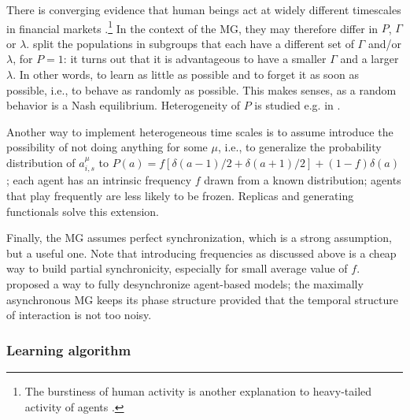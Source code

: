 \documentclass[aps,twocolumn,nofootinbib,sortedaddress,reprint]{revtex4-1}
\begin{document}
There is converging evidence that human beings act at widely different
timescales in financial markets
\cite{LilloUtility,zhou2012strategies}.\footnote{The burstiness of
  human activity is another explanation to heavy-tailed activity of
  agents \cite{BarabasiActivity}.} In the context of the MG, they may
therefore differ in $P$, $\Gamma$ or
$\lambda$. \textcite{mosetti2006minority} split the populations in
subgroups that each have a different set of $\Gamma$ and/or $\lambda$,
for $P=1$: it turns out that it is advantageous to have a smaller
$\Gamma$ and a larger $\lambda$. In other words, to learn as little as possible
and to forget it as soon as possible, i.e., to behave as randomly as
possible. This makes senses, as a random behavior is a Nash equilibrium. Heterogeneity of $P$ is
studied e.g. in
\textcite{CZ97,CZ98,SavitPayoff,JohnsonEnhancedWinnings,MMM}.

Another way to implement heterogeneous time scales is to assume
introduce the possibility of not doing anything for some $\mu$, i.e.,
to generalize the probability distribution of $a_{i,s}^\mu$ to
$P(a)=f[\delta(a-1)/2+\delta(a+1)/2]+(1-f)\delta(a)$ \cite{Piai}; each
agent has an intrinsic frequency $f$ drawn from a known distribution;
agents that play frequently are less likely to be frozen. Replicas
\cite{Piai} and generating functionals \cite{demartino2003dynamics}
solve this extension.

Finally, the MG assumes perfect synchronization, which is a strong
assumption, but a useful one. Note that introducing frequencies as
discussed above is a cheap way to build partial synchronicity,
especially for small average value of
$f$. \textcite{mosetti2009structure} proposed a way to fully
desynchronize agent-based models; the maximally asynchronous MG keeps
its phase structure provided that the temporal structure of
interaction is not too noisy.

\subsubsection{Learning algorithm}
\end{document}
